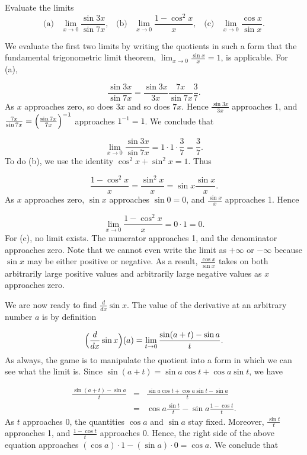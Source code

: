 \begin{example} Evaluate the limits 
$$
\mbox{(a)}\;\;\; \lim_{x \rightarrow 0} \frac{\sin 3x}{\sin 7x},\;\;\;   
\mbox{(b)}\;\;\; \lim_{x \rightarrow 0} \frac{1 - \cos^{2} x}{x}, \;\;\; 
\mbox{(c)}\;\;\; \lim_{x \rightarrow 0} \frac{\cos x}{\sin x}.
$$

\noindent We evaluate the first two limits by writing the quotients in such a form that the fundamental trigonometric limit theorem, $\lim_{x \rightarrow 0} \frac{\sin x}{x} = 1$, is applicable. For (a),

$$
\frac{\sin 3x}{\sin 7x} = \frac{\sin 3x}{3x} \frac{7x}{\sin 7x} \frac{3}{7}.
$$
\noindent As $x$ approaches zero, so does $3x$ and so does $7x$. Hence $\frac{\sin 3x}{3x}$ approaches 1, and $\frac{7x}{\sin 7x} = \Bigl(\frac{\sin 7x}{7x} \Bigr)^{-1}$ approaches $1^{-1} = 1$. 
We conclude that


$$
\lim_{x \rightarrow 0} \frac{\sin 3x}{\sin 7x} = 1 \cdot 1 \cdot \frac{3}{7} = \frac{3}{7}. 
$$
\noindent To do (b), we use the identity $\cos^{2} x + \sin^{2} x = 1$. Thus 

$$
\frac{1 - \cos^{2}x}{x} = \frac{\sin^{2} x}{x} = \sin x \frac{\sin x}{x}.
$$
\noindent As $x$ approaches zero, $\sin x$ approaches $\sin 0 = 0$, and $\frac{\sin x}{x}$ approaches 1. Hence

$$
\lim_{x \rightarrow 0} \frac{1 - \cos^{2}x}{x} = 0 \cdot 1 = 0.
$$
\noindent For (c), no limit exists. The numerator approaches 1, and the denominator approaches zero.  Note that we cannot even write the limit as $+\infty$ or $-\infty$ because $\sin x$ may be either positive or negative. As a result, $\frac{\cos x}{\sin x}$ takes on both arbitrarily large positive values and arbitrarily large negative values as $x$ approaches zero.
\end{example}

We are now ready to find $\frac{d}{dx} \sin x$. The value of the derivative at an arbitrary number $a$ is by definition

$$
\Bigl(\frac{d}{dx} \sin x \Bigr) (a) = \lim_{t \rightarrow 0} \frac{\sin (a + t) - \sin a}{t}.
$$
\noindent As always, the game is to manipulate the quotient into a form in which we can see what the limit is. Since $\sin(a + t) = \sin a \cos t + \cos a \sin t$, we have 

\begin{eqnarray*}
\frac{\sin(a + t) - \sin a}{t} &=& \frac{\sin a \cos t + \cos a \sin t - \sin a}{t}\\
                                         &=& \cos a \frac{\sin t}{t} - \sin a \frac{1 - \cos t}{t}.
\end{eqnarray*}
\noindent As $t$ approaches 0, the quantities $\cos a$ and $\sin a$ stay fixed. Moreover, $\frac{\sin t}{t}$   approaches 1, and $\frac{1 - \cos t}{t}$ approaches 0. Hence, the right side of the above equation approaches 
$(\cos a) \cdot 1 - (\sin a) \cdot 0 = \cos a$. We conclude that

